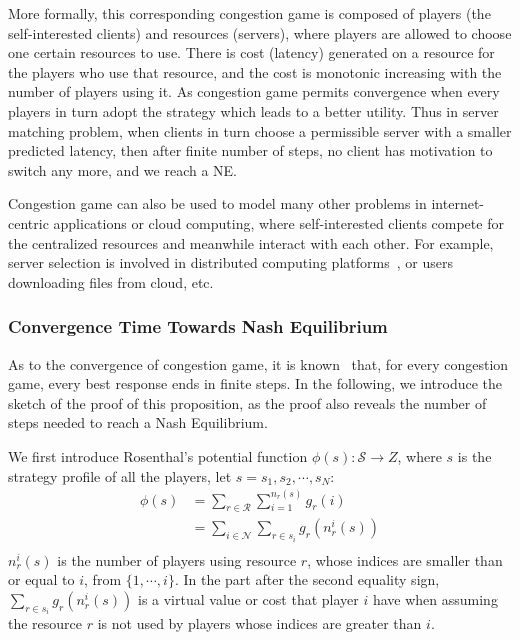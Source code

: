 More formally, this corresponding congestion game is composed of players (the self-interested clients) and resources (servers), where players are allowed to choose one certain resources to use. 
There is cost (latency) generated on a resource for the players who use that resource, and the cost is monotonic increasing with the number of players using it. 
As congestion game permits convergence when every players in turn adopt the strategy which leads to a better utility.
Thus in server matching problem, when clients in turn choose a permissible server with a smaller predicted latency, then after finite number of steps, no client has motivation to switch any more, and we reach a NE.

Congestion game can also be used to model many other problems in internet-centric applications or cloud computing, where self-interested clients compete for the centralized resources and meanwhile interact with each other.
For example, server selection is involved in distributed computing platforms~\cite{Cloud_Computing_2010}, or users downloading files from cloud, etc.






\subsubsection*{Convergence Time Towards Nash Equilibrium}
As to the convergence of congestion game, it is known~\cite{Voecking06congestiongames} that, for every congestion game, every best response ends in finite steps.
In the following, we introduce the sketch of the proof of this proposition, as the proof also reveals the number of steps needed to reach a Nash Equilibrium.

We first introduce Rosenthal's potential function $\phi(s):\mathcal{S}\rightarrow Z$, where $s$ is the strategy profile of all the players, let $s = s_1, s_2,\cdots, s_N$:
\begin{equation}
\label{4}
\begin{split}
\phi(s) 
& =\sum\limits^{}_{r\in \mathcal{R}} \sum\limits^{n_r(s)}_{i=1} g_r(i)\\
& =\sum\limits_{i\in \mathcal{N}} \sum\limits^{}_{r\in s_i} g_r(n_r^i(s))\\
\end{split}
\end{equation}
$n_r^i(s)$ is the number of players using resource $r$, whose indices are smaller than or equal to $i$, \ie from $\{1,\cdots,i\}$. 
In the part after the second equality sign, $\sum\limits^{}_{r\in s_i} g_r(n_r^i(s))$ is a virtual value or cost that player $i$ have when assuming the resource $r$ is not used by players whose indices are greater than $i$.

